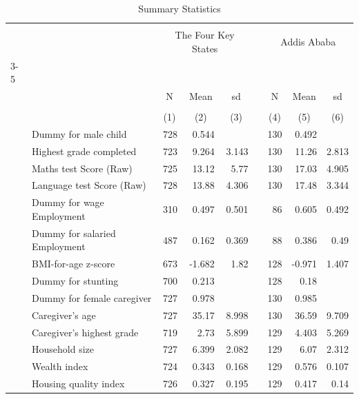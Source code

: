 \begin{table}[ht]
\centering
\caption{Summary Statistics} 
\label{tab:sum-stat}
\begin{tabular}{llrrrlrrr}
  \toprule
   \\[-1.8ex]  & & \multicolumn{3}{c}{The Four Key States} & & \multicolumn{3}{c}{Addis Ababa}  \\[0.2ex] \cline{3-5}  \cline{7-9}  \\[-1.2ex]  & & \multicolumn{1}{c}{N} & \multicolumn{1}{c}{Mean} & \multicolumn{1}{c}{sd} & & \multicolumn{1}{c}{N} & \multicolumn{1}{c}{Mean} & \multicolumn{1}{c}{sd} \\  \\[-1.8ex] &  & \multicolumn{1}{c}{(1)} & \multicolumn{1}{c}{(2)} & \multicolumn{1}{c}{(3)} & & 
  \multicolumn{1}{c}{(4)} & \multicolumn{1}{c}{(5)} & \multicolumn{1}{c}{(6)} \\  \midrule
 & Dummy for male child &   728 & 0.544 &  &  &   130 & 0.492 &  \\ 
   & Highest grade completed &   723 & 9.264 & 3.143 &  &   130 & 11.26 & 2.813 \\ 
   & Maths test Score (Raw) &   725 & 13.12 &  5.77 &  &   130 & 17.03 & 4.905 \\ 
   & Language test Score (Raw) &   728 & 13.88 & 4.306 &  &   130 & 17.48 & 3.344 \\ 
   & Dummy for wage Employment &   310 & 0.497 & 0.501 &  &    86 & 0.605 & 0.492 \\ 
   & Dummy for salaried Employment &   487 & 0.162 & 0.369 &  &    88 & 0.386 &  0.49 \\ 
   & BMI-for-age z-score &   673 & -1.682 &  1.82 &  &   128 & -0.971 & 1.407 \\ 
   & Dummy for stunting &   700 & 0.213 &  &  &   128 &  0.18 &  \\ 
   & Dummy for female caregiver &   727 & 0.978 &  &  &   130 & 0.985 &  \\ 
   & Caregiver's age &   727 & 35.17 & 8.998 &  &   130 & 36.59 & 9.709 \\ 
   & Caregiver's highest grade &   719 &  2.73 & 5.899 &  &   129 & 4.403 & 5.269 \\ 
   & Household size &   727 & 6.399 & 2.082 &  &   129 &  6.07 & 2.312 \\ 
   & Wealth index &   724 & 0.343 & 0.168 &  &   129 & 0.576 & 0.107 \\ 
   & Housing quality index &   726 & 0.327 & 0.195 &  &   129 & 0.417 &  0.14 \\ 

\end{tabular}
\end{table}
